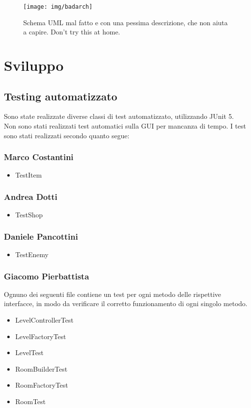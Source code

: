 \documentclass[a4paper,12pt]{report}
\begin{document}
\begin{figure}[h]
\centering{}
\texttt{[image: img/badarch]}
\caption{Schema UML mal fatto e con una pessima descrizione, che non aiuta a capire. Don't try this at home.}
\label{img:badarch}
\end{figure}


\chapter{Sviluppo}
\section{Testing automatizzato}
Sono state realizzate diverse classi di test automatizzato, utilizzando JUnit 5.
Non sono stati realizzati test automatici sulla GUI per mancanza di tempo.
I test sono stati realizzati secondo quanto segue:
\subsection*{Marco Costantini}
\begin{itemize}
    \item TestItem
\end{itemize}
\subsection*{Andrea Dotti}
\begin{itemize}
    \item TestShop
\end{itemize}
\subsection*{Daniele Pancottini}
\begin{itemize}
    \item TestEnemy
\end{itemize}
\subsection*{Giacomo Pierbattista}
Ognuno dei seguenti file contiene un test per ogni metodo delle rispettive interfacce, in modo da verificare
il corretto funzionamento di ogni singolo metodo.
\begin{itemize}
    \item LevelControllerTest
    \item LevelFactoryTest
    \item LevelTest
    \item RoomBuilderTest
    \item RoomFactoryTest
    \item RoomTest
\end{itemize}
\end{document}
